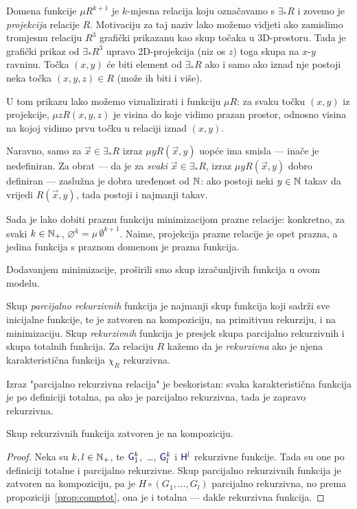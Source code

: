 Domena funkcije $\mu R^{k+1}$ je $k$-mjesna relacija koju označavamo s $\exists_*R$ i zovemo je \emph{projekcija} relacije $R$. Motivaciju za taj naziv lako možemo vidjeti ako zamislimo tromjesnu relaciju $R^3$ grafički prikazanu kao skup točaka u 3D-prostoru. Tada je grafički prikaz od $\exists_*R^3$ upravo 2D-projekcija (niz os $z$) toga skupa na $x$-$y$ ravninu. Točka $(x,y)$ će biti element od $\exists_*R$ ako i samo ako iznad nje postoji neka točka $(x,y,z)\in R$ (može ih biti i više).

U tom prikazu lako možemo vizualizirati i funkciju $\mu R$: za svaku točku $(x,y)$ iz projekcije, $\mu zR(x,y,z)$ je visina do koje vidimo prazan prostor, odnosno visina na kojoj vidimo prvu točku u relaciji iznad $(x,y)$. 

Naravno, samo za $\vec x\in\exists_*R$ izraz $\mu yR(\vec x,y)$ uopće ima smisla --- inače je nedefiniran. Za obrat --- da je za \emph{svaki} $\vec x\in\exists_*R$, izraz $\mu yR(\vec x,y)$ dobro definiran --- zaslužna je dobra uređenost od ${\mathbb N}$: ako postoji neki $y\in{\mathbb N}$ takav da vrijedi $R(\vec x,y)$, tada postoji i najmanji takav.

\begin{primjer}[{name=[prazna funkcija minimizacijom]}]\label{pr:varnothingprek}
Sada je lako dobiti praznu funkciju minimizacijom prazne relacije: konkretno, za svaki $k\in{\mathbb N}_+$, $\varnothing^k=\mu\,\emptyset^{k+1}$. Naime, projekcija prazne relacije je opet prazna, a jedina funkcija s praznom domenom je prazna funkcija.
\end{primjer}

Dodavanjem minimizacije, proširili smo skup izračunljivih funkcija u ovom modelu.

\begin{definicija}[{name=[(parcijalno) rekurzivne funkcije i relacije]}]\label{def:parcrek}
Skup \emph{parcijalno rekurzivnih} funkcija je najmanji skup funkcija koji sadrži sve inicijalne funkcije, te je zatvoren na kompoziciju, na primitivnu rekurziju, i na minimizaciju. Skup \emph{rekurzivnih} funkcija je presjek skupa parcijalno rekurzivnih i skupa totalnih funkcija. Za relaciju $R$ kažemo da je \emph{rekurzivna} ako je njena karakteristična funkcija $\chi_R$ rekurzivna.
\end{definicija}

Izraz "parcijalno rekurzivna relacija" je beskoristan: svaka karakteristična funkcija je po definiciji totalna, pa ako je parcijalno rekurzivna, tada je zapravo rekurzivna.

\begin{lema}[{name=[zatvorenost skupa rekurzivnih funkcija na kompoziciju]}]\label{lm:comprek}
Skup rekurzivnih funkcija zatvoren je na kompoziciju.
\end{lema}
\begin{proof}
Neka su $k,l\in{\mathbb N}_+$, te $\f G_1^k$,~\ldots, $\f G_l^k$ i $\f H^l$ rekurzivne funkcije. Tada su one po definiciji totalne i parcijalno rekurzivne. Skup parcijalno rekurzivnih funkcija je zatvoren na kompoziciju, pa je $H\circ(G_1,\dotsc,G_l)$ parcijalno rekurzivna, no prema propoziciji~\ref{prop:comptot}, ona je i totalna --- dakle rekurzivna funkcija.
\end{proof}

